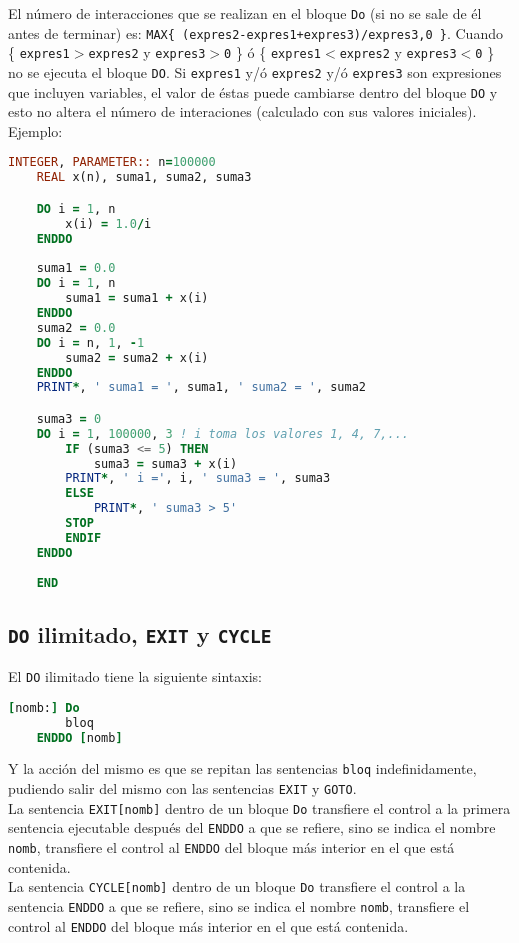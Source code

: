 El número de interacciones que se realizan en el bloque {\tt Do} (si no se sale de él antes de terminar) es: {\tt MAX\{ (expres2-expres1+expres3)/expres3,0 \}}. Cuando \{ {\tt expres1$>$expres2} y {\tt expres3$>$0} \}  ó \{ {\tt expres1$<$expres2} y {\tt expres3$<$0} \}  no se ejecuta el bloque {\tt DO}. Si {\tt expres1} y/ó {\tt expres2} y/ó {\tt expres3} son expresiones que incluyen variables, el valor de éstas puede cambiarse dentro del bloque  {\tt DO} y esto no altera el número de interaciones (calculado con sus valores iniciales). Ejemplo:

\begin{lstlisting}[language=Fortran]
	INTEGER, PARAMETER:: n=100000
	REAL x(n), suma1, suma2, suma3

	DO i = 1, n
		x(i) = 1.0/i
	ENDDO
	
	suma1 = 0.0
	DO i = 1, n
		suma1 = suma1 + x(i)
	ENDDO
	suma2 = 0.0
	DO i = n, 1, -1
		suma2 = suma2 + x(i)
	ENDDO
	PRINT*, ' suma1 = ', suma1, ' suma2 = ', suma2

	suma3 = 0
	DO i = 1, 100000, 3 ! i toma los valores 1, 4, 7,...
		IF (suma3 <= 5) THEN
			suma3 = suma3 + x(i)
		PRINT*, ' i =', i, ' suma3 = ', suma3
		ELSE
			PRINT*, ' suma3 > 5'
		STOP
		ENDIF
	ENDDO
	
	END
\end{lstlisting}




\subsection{{\tt DO} ilimitado, {\tt EXIT} y {\tt CYCLE}}

El {\tt DO} ilimitado tiene la siguiente sintaxis:

\begin{lstlisting}[language=Fortran]
	[nomb:] Do 
		bloq
	ENDDO [nomb]
\end{lstlisting}
Y la acción del mismo es que se repitan las sentencias {\tt bloq} indefinidamente, pudiendo salir del mismo con las sentencias {\tt EXIT} y {\tt GOTO}. \\


La sentencia {\tt EXIT[nomb]} dentro de un bloque {\tt Do} transfiere el control a la primera sentencia ejecutable después del {\tt ENDDO} a que se refiere, sino se indica el nombre {\tt nomb}, transfiere el control al {\tt ENDDO} del bloque más interior en el que está contenida. \\ 


La sentencia {\tt CYCLE[nomb]} dentro de un bloque {\tt Do} transfiere el control a la sentencia {\tt ENDDO} a que se refiere, sino se indica el nombre {\tt nomb}, transfiere el control al {\tt ENDDO} del bloque más interior en el que está contenida. 


